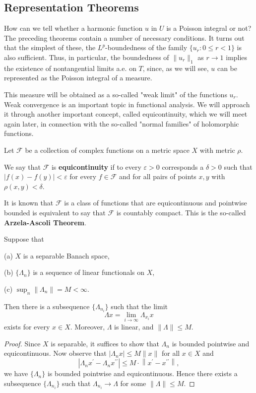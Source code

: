 \subsection{Representation Theorems}
How can we tell whether a harmonic function $u$ in $U$ is a Poisson integral or not? The preceding theorems contain a number of necessary conditions. It turns out that the simplest of these, the $L^p$-boundedness of the family $\{u_r:0\le r<1\}$ is also sufficient. Thus, in particular, the boundedness of $\|u_r\|_1$ as $r\to 1$ implies the existence of nontangential limits a.e. on $T$, since, as we will see, $u$ can be represented as the Poisson integral of a measure.\par
This measure will be obtained as a so-called "weak limit" of the functions $u_r$. Weak convergence is an important topic in functional analysis. We will approach it through another important concept, called equicontinuity, which we will meet again later, in connection with the so-called "normal families" of holomorphic functions.
\begin{definition}
Let $\mathscr{F}$ be a collection of complex functions on a metric space $X$ with metric $\rho$.\par
We say that $\mathscr{F}$ is \textbf{equicontinuity} if to every $\varepsilon>0$ corresponds a $\delta>0$ such that $|f(x)-f(y)|<\varepsilon$ for every $f\in\mathscr{F}$ and for all pairs of points $x,y$ with $\rho(x,y)<\delta$.
\end{definition}
It is known that $\mathscr{F}$ is a class of functions that are equicontinuous and pointwise bounded is equivalent to say that $\mathscr{F}$ is countably compact. This is the so-called \textbf{Arzela-Ascoli Theorem}.
\begin{theorem}
Suppose that \par
(a) $X$ is a separable Banach space,\par
(b) $\{\Lambda_n\}$ is a sequence of linear functionals on $X$,\par
(c) $\sup_n\|\Lambda_n\|=M<\infty$.\par
Then there is a subsequence $\{\Lambda_{n_i}\}$ such that the limit 
$$\Lambda x=\lim_{i\to\infty}\Lambda_{x_i}x$$
exists for every $x\in X$. Moreover, $\Lambda$ is linear, and $\|\Lambda\|\le M$.
\end{theorem}
\begin{proof}
Since $X$ is separable, it suffices to show that $\Lambda_n$ is bounded pointwise and equicontinuous. Now observe that $|\Lambda_nx|\le M\|x\|$ for all $x\in X$ and 
$$
\left| \Lambda _nx^{\prime}-\Lambda _nx^{\prime\prime} \right|\le M\cdot \left\| x^{\prime}-x^{\prime\prime} \right\| ,
$$
we have $\{\Lambda_n\}$ is bounded pointwise and equicontinuous. Hence there exists a subsequence $\{\Lambda_{n_i}\}$ such that $\Lambda_{n_i}\to\Lambda$ for some $\|\Lambda\|\le M$.
\end{proof}
